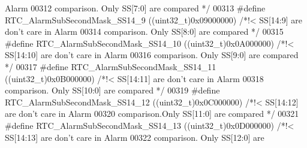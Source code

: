 \begin{DoxyCode}
{       Alarm }
00312 \textcolor{comment}{                                                                       comparison. Only SS[7:0] are
       compared */}
00313 \textcolor{preprocessor}{#}\textcolor{preprocessor}{define} \textcolor{preprocessor}{RTC\_AlarmSubSecondMask\_SS14\_9}      \textcolor{preprocessor}{(}\textcolor{preprocessor}{(}\textcolor{preprocessor}{uint32\_t}\textcolor{preprocessor}{)}0x09000000\textcolor{preprocessor}{)} \textcolor{comment}{/*!< SS[14:9] are don't care in
       Alarm }
00314 \textcolor{comment}{                                                                       comparison. Only SS[8:0] are
       compared */}
00315 \textcolor{preprocessor}{#}\textcolor{preprocessor}{define} \textcolor{preprocessor}{RTC\_AlarmSubSecondMask\_SS14\_10}     \textcolor{preprocessor}{(}\textcolor{preprocessor}{(}\textcolor{preprocessor}{uint32\_t}\textcolor{preprocessor}{)}0x0A000000\textcolor{preprocessor}{)} \textcolor{comment}{/*!< SS[14:10] are don't care in
       Alarm }
00316 \textcolor{comment}{                                                                       comparison. Only SS[9:0] are
       compared */}
00317 \textcolor{preprocessor}{#}\textcolor{preprocessor}{define} \textcolor{preprocessor}{RTC\_AlarmSubSecondMask\_SS14\_11}     \textcolor{preprocessor}{(}\textcolor{preprocessor}{(}\textcolor{preprocessor}{uint32\_t}\textcolor{preprocessor}{)}0x0B000000\textcolor{preprocessor}{)} \textcolor{comment}{/*!< SS[14:11] are don't care in
       Alarm }
00318 \textcolor{comment}{                                                                       comparison. Only SS[10:0] are
       compared */}
00319 \textcolor{preprocessor}{#}\textcolor{preprocessor}{define} \textcolor{preprocessor}{RTC\_AlarmSubSecondMask\_SS14\_12}     \textcolor{preprocessor}{(}\textcolor{preprocessor}{(}\textcolor{preprocessor}{uint32\_t}\textcolor{preprocessor}{)}0x0C000000\textcolor{preprocessor}{)} \textcolor{comment}{/*!< SS[14:12] are don't care in
       Alarm }
00320 \textcolor{comment}{                                                                       comparison.Only SS[11:0] are
       compared */}
00321 \textcolor{preprocessor}{#}\textcolor{preprocessor}{define} \textcolor{preprocessor}{RTC\_AlarmSubSecondMask\_SS14\_13}     \textcolor{preprocessor}{(}\textcolor{preprocessor}{(}\textcolor{preprocessor}{uint32\_t}\textcolor{preprocessor}{)}0x0D000000\textcolor{preprocessor}{)} \textcolor{comment}{/*!< SS[14:13] are don't care in
       Alarm }
00322 \textcolor{comment}{                                                                       comparison. Only SS[12:0] are
}
\end{DoxyCode}
